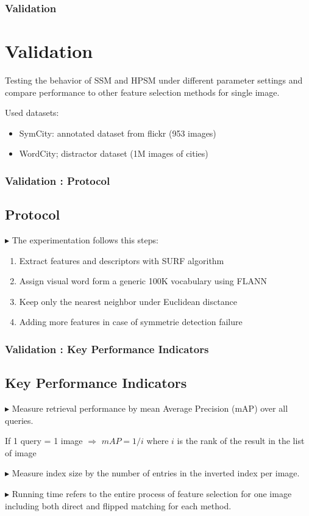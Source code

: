 \documentclass[11pt]{beamer}
\begin{document}
\begin{frame}
\frametitle{Validation}
\section{Validation}
Testing the behavior of SSM and HPSM under different parameter settings and compare performance to other feature selection methods for single image.

\vspace{0.3cm}
Used datasets:
\begin{itemize}
\item SymCity: annotated dataset from flickr (953 images)
\item WordCity; distractor dataset (1M images of cities)
\end{itemize}

\end{frame}

\begin{frame}
\frametitle{Validation : Protocol}
\subsection{Protocol}
$\blacktriangleright$ The experimentation follows this steps:
\begin{enumerate}
\item Extract features and descriptors with SURF algorithm
\item Assign visual word form a generic 100K vocabulary using FLANN
\item Keep only the nearest neighbor under Euclidean disctance
\item Adding more features in case of symmetrie detection failure 
\end{enumerate}
\end{frame}

\begin{frame}
\frametitle{Validation : Key Performance Indicators}
\subsection{Key Performance Indicators}
$\blacktriangleright$ Measure retrieval performance by mean Average Precision (mAP) over all queries.

\vspace{0.3cm}
If 1 query = 1 image $\Rightarrow$ $mAP = 1/i$ where $i$ is the rank of the result in the list of image

\vspace{0.3cm}
$\blacktriangleright$ Measure index size by the number of entries in the inverted index per image.

\vspace{0.3cm}
$\blacktriangleright$ Running time refers to the entire process of feature selection for one image including both direct and flipped matching for each method.
\end{frame}
\end{document}
